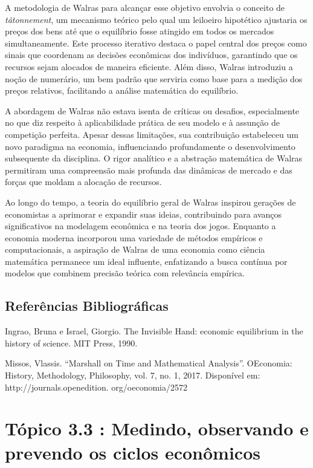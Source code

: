 \documentclass[a4paper,12pt]{article}[abntex2]
\begin{document}
A metodologia de Walras para alcançar esse objetivo envolvia o conceito de \textit{tâtonnement}, um mecanismo teórico pelo qual um leiloeiro hipotético ajustaria os preços dos bens até que o equilíbrio fosse atingido em todos os mercados simultaneamente. Este processo iterativo destaca o papel central dos preços como sinais que coordenam as decisões econômicas dos indivíduos, garantindo que os recursos sejam alocados de maneira eficiente. Além disso, Walras introduziu a noção de numerário, um bem padrão que serviria como base para a medição dos preços relativos, facilitando a análise matemática do equilíbrio.

A abordagem de Walras não estava isenta de críticas ou desafios, especialmente no que diz respeito à aplicabilidade prática de seu modelo e à assunção de competição perfeita. Apesar dessas limitações, sua contribuição estabeleceu um novo paradigma na economia, influenciando profundamente o desenvolvimento subsequente da disciplina. O rigor analítico e a abstração matemática de Walras permitiram uma compreensão mais profunda das dinâmicas de mercado e das forças que moldam a alocação de recursos.

Ao longo do tempo, a teoria do equilíbrio geral de Walras inspirou gerações de economistas a aprimorar e expandir suas ideias, contribuindo para avanços significativos na modelagem econômica e na teoria dos jogos. Enquanto a economia moderna incorporou uma variedade de métodos empíricos e computacionais, a aspiração de Walras de uma economia como ciência matemática permanece um ideal influente, enfatizando a busca contínua por modelos que combinem precisão teórica com relevância empírica.

\subsection{\textbf{Referências Bibliográficas}}
Ingrao, Bruna e Israel, Giorgio. The Invisible Hand: economic equilibrium in the history of
science. MIT Press, 1990.

Missos, Vlassis. “Marshall on Time and Mathematical Analysis”. OEconomia: History,
Methodology, Philosophy, vol. 7, no. 1, 2017. Disponível em: http://journals.openedition.
org/oeconomia/2572



\section{\textbf{Tópico 3.3 : Medindo, observando e prevendo os ciclos econômicos}}
\end{document}
